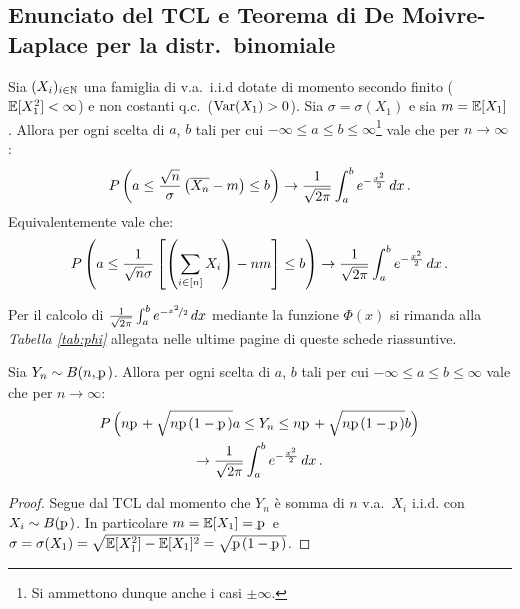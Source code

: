 \begin{multicols*}{2}
\subsection{Enunciato del TCL e Teorema di De Moivre-Laplace per la distr.~binomiale}
\begin{theorem}
    Sia $(X_i)_{i \in \mathbb{N}}$ una famiglia di v.a.~i.i.d dotate di momento secondo
    finito ($\mathbb{E}[X_1^2] < \infty$) e non costanti q.c.~($\operatorname{Var}(X_1) > 0$). Sia
    $\sigma = \sigma(X_1)$ e sia $m = \mathbb{E}[X_1]$. Allora per ogni scelta di $a$, $b$
    tali per cui $-\infty \leq a \leq b \leq \infty$\footnote{
        Si ammettono dunque anche i casi $\pm \infty$.
    } vale che per $n \to \infty$:
    \[
        P\left(a \leq \frac{\sqrt{n}}{\sigma} \left(\overline{X_n} - m\right) \leq b\right) \to \frac{1}{\sqrt{2\pi}}\int_a^b e^{-\frac{x^2}{2}} \mathop{dx}. 
    \]
    Equivalentemente vale che:
    \[
        P\left(a \leq \frac{1}{\sqrt{n}\sigma} \left[\left(\sum_{i \in [n]} X_i\right) - nm\right] \leq b\right) \to \frac{1}{\sqrt{2\pi}}\int_a^b e^{-\frac{x^2}{2}} \mathop{dx}. 
    \]
\end{theorem}

\begin{warn}
    Per il calcolo di $\frac{1}{\sqrt{2\pi}}\int_a^b e^{-\nicefrac{x^2}{2}} \mathop{dx}$ mediante
    la funzione $\Phi(x)$ si rimanda
    alla \textit{Tabella \ref{tab:phi}} allegata nelle ultime pagine di queste schede riassuntive.
\end{warn}

\begin{corollary}
    Sia $Y_n \sim B(n, \pp)$. Allora per ogni scelta di $a$, $b$ tali per cui
    $-\infty \leq a \leq b \leq \infty$ vale che per $n \to \infty$:
    \begin{multline*}
        P\left(n\pp + \sqrt{n \pp (1- \pp)} a  \leq Y_n \leq n\pp + \sqrt{n \pp (1 - \pp)} b\right) \\
        \to \frac{1}{\sqrt{2\pi}}\int_a^b e^{-\frac{x^2}{2}} \dx.
    \end{multline*}
\end{corollary}

\begin{proof}
    Segue dal TCL dal momento che $Y_n$ è somma di $n$ v.a.~$X_i$ i.i.d. con $X_i \sim B(\pp)$. In particolare $m = \EE[X_1] = \pp$ e $\sigma = \sigma(X_1) = \sqrt{\EE[X_1^2] - \EE[X_1]^2} = \sqrt{\pp (1-\pp)}$.
\end{proof}


\end{multicols*}
